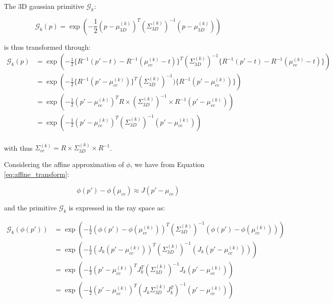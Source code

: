 The 3D gaussian primitive $\mathcal{G}_{k}$: 

\begin{equation}
    \mathcal{G}_{k}(p) = \exp \left(-\frac{1}{2}(p-\mu^{(k)}_{3D})^{T}(\Sigma^{(k)}_{3D})^{-1}(p-\mu^{(k)}_{3D})\right)
  \end{equation}
  
is thus transformed through: 
\begin{equation}
    \begin{aligned}
    \mathcal{G}_{k}(p) &= \exp \left( -\frac{1}{2} \{R^{-1}(p'-t) - R^{-1}(\mu^{(k)}_{cc} -t)\}^{T} (\Sigma^{(k)}_{3D})^{-1}\{R^{-1}(p'-t) - R^{-1}(\mu^{(k)}_{cc} -t)\}  \right) \\
    &= \exp \left( -\frac{1}{2}\{ R^{-1}(p'-\mu^{(k)}_{cc})\}^{T}(\Sigma^{(k)}_{3D})^{-1})\{ R^{-1}(p'-\mu^{(k)}_{cc})\} \right) \\
    &= \exp \left( -\frac{1}{2}(p'-\mu^{(k)}_{cc})^{T}R\times(\Sigma^{(k)}_{3D})^{-1}\times R^{-1}(p'-\mu^{(k)}_{cc})\right) \\
    &= \exp \left( -\frac{1}{2}(p'-\mu^{(k)}_{cc})^{T}(\Sigma^{(k)}_{3D})^{-1}(p'-\mu^{(k)}_{cc})\right) \\
    \end{aligned}
\end{equation}

with thus $\Sigma^{(k)}_{cc} = R\times \Sigma^{(k)}_{3D}\times R^{-1}$. \newline


Considering the affine approximation of $\phi$, we have from Equation \eqref{eq:affine_transform}: 

\begin{equation}
  \phi(p') - \phi(\mu_{cc}) \approx J(p' - \mu_{cc})
\end{equation}

and the primitive $\mathcal{G}_{k}$ is expressed in the ray space as: 

\begin{equation}
  \begin{aligned}
\mathcal{G}_{k}(\phi(p')) &= \exp \left( -\frac{1}{2}(\phi(p')-\phi(\mu^{(k)}_{cc}))^{T}(\Sigma^{(k)}_{3D})^{-1}(\phi(p')-\phi(\mu^{(k)}_{cc}))\right)\\
                        &= \exp \left( -\frac{1}{2}(J_{k}(p'-\mu^{(k)}_{cc}))^{T}(\Sigma^{(k)}_{3D})^{-1}(J_{k}(p'-\mu^{(k)}_{cc}))\right) \\
                        &= \exp \left( -\frac{1}{2}(p'-\mu^{(k)}_{cc})^{T}J_{k}^{T}(\Sigma^{(k)}_{3D})^{-1}J_{k}(p'-\mu^{(k)}_{cc})\right)\\
                        &= \exp \left( -\frac{1}{2}(p'-\mu^{(k)}_{cc})^{T}(J_{k}\Sigma^{(k)}_{3D}J_{k}^{T})^{-1}(p'-\mu^{(k)}_{cc})\right)
  \end{aligned}
\end{equation}

